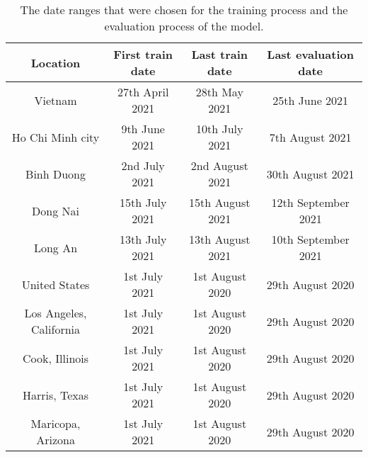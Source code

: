 \begin{table}[h]
    \centering
    \begin{tabular}{| c | c | c | c |}
        Location & First train date & Last train date & Last evaluation date \\
        \hline\hline
        Vietnam & 27th April 2021 & 28th May 2021 & 25th June 2021 \\
        \hline
        Ho Chi Minh city & 9th June 2021 & 10th July 2021 & 7th August 2021 \\
        \hline
        Binh Duong & 2nd July 2021 & 2nd August 2021 & 30th August 2021 \\
        \hline
        Dong Nai & 15th July 2021 & 15th August 2021 & 12th September 2021 \\
        \hline
        Long An & 13th July 2021 & 13th August 2021 & 10th September 2021 \\
        \hline
        United States & 1st July 2021 & 1st August 2020 & 29th August 2020 \\
        \hline
        Los Angeles, California & 1st July 2021 & 1st August 2020 & 29th August 2020 \\
        \hline
        Cook, Illinois & 1st July 2021 & 1st August 2020 & 29th August 2020 \\
        \hline
        Harris, Texas & 1st July 2021 & 1st August 2020 & 29th August 2020 \\
        \hline
        Maricopa, Arizona & 1st July 2021 & 1st August 2020 & 29th August 2020 \\
        \hline
    \end{tabular}
    \caption{The date ranges that were chosen for the training process and the evaluation process of the model.}
    \label{tab:chosen-dataset-dates}
\end{table}

